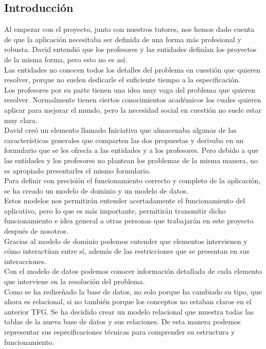 \documentclass{article}
\begin{document}
\subsection{Introducción}
Al empezar con el proyecto, junto con nuestros tutores, nos hemos dado cuenta de que la aplicación necesitaba ser definida de una forma más profesional y robusta. David entendió que los profesores y las entidades definían los proyectos de la misma forma, pero esto no es así.\\
Las entidades no conocen todos los detalles del problema en cuestión que quieren resolver, porque no suelen dedicarle el suficiente tiempo a la especificación.\\
Los profesores por su parte tienen una idea muy vaga del problema que quieren resolver. Normalmente tienen ciertos conocimientos académicos los cuales quieren aplicar para mejorar el mundo, pero la necesidad social en cuestión no suele estar muy clara.\\
David creó un elemento llamado Iniciativa que almacenaba algunas de las características generales que comparten las dos propuestas y derivaba en un formulario que se les ofrecía a las entidades y a los profesores. Pero debido a que las entidades y los profesores no plantean los problemas de la misma manera, no es apropiado presentarles el mismo formulario.\\
Para definir con precisión el funcionamiento correcto y completo de la aplicación, se ha creado un modelo de dominio y un modelo de datos.\\
Estos modelos nos permitirán entender acertadamente el funcionamiento del aplicativo, pero lo que es más importante, permitirán transmitir dicho funcionamiento e idea general a otras personas que trabajarán en este proyecto después de nosotros.\\
Gracias al modelo de dominio podemos entender que elementos intervienen y cómo interactúan entre sí, además de las restricciones que se presentan en sus interacciones.\\
Con el modelo de datos podemos conocer información detallada de cada elemento que interviene en la resolución del problema.\\
Como se ha rediseñado la base de datos, no solo porque ha cambiado su tipo, que ahora es relacional, si no también porque los conceptos no estaban claros en el anterior TFG. Se ha decidido crear un modelo relacional que muestra todas las tablas de la nueva base de datos y sus relaciones. De esta manera podemos representar sus especificaciones técnicas para comprender su estructura y funcionamiento. 
\end{document}
